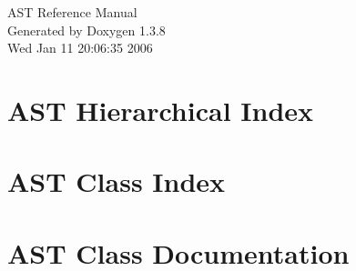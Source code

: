 \documentclass[a4paper]{book}
\begin{document}
\begin{titlepage}
\vspace*{7cm}
\begin{center}
{\Large AST Reference Manual}\\
\vspace*{1cm}
{\large Generated by Doxygen 1.3.8}\\
\vspace*{0.5cm}
{\small Wed Jan 11 20:06:35 2006}\\
\end{center}
\end{titlepage}
\clearemptydoublepage
{}
\tableofcontents
\clearemptydoublepage
{}
\chapter{AST Hierarchical Index}

\chapter{AST Class Index}

\chapter{AST Class Documentation}













\printindex
\end{document}
